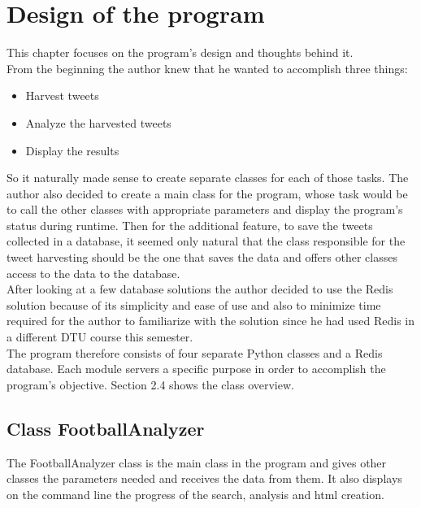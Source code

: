 \chapter[Design of the program]{Design of the program}
\label{chap:design_of_the_program}

This chapter focuses on the program's design and thoughts behind it.\\

From the beginning the author knew that he wanted to accomplish three things:
\begin{itemize}
	\item Harvest tweets
	\item Analyze the harvested tweets
	\item Display the results
\end{itemize}

So it naturally made sense to create separate classes for each of those tasks. The author also decided to
create a main class for the program, whose task would be to call the other classes with appropriate parameters
and display the program's status during runtime. Then for the additional feature, to save the tweets collected
in a database, it seemed only natural that the class responsible for the tweet harvesting should be the one that
saves the data and offers other classes access to the data to the database.\\

After looking at a few database solutions the author decided to use the Redis solution because of its simplicity
and ease of use and also to minimize time required for the author to familiarize with the solution since he had
used Redis in a different DTU course this semester.\\

The program therefore consists of four separate Python classes and a Redis database. Each module servers a specific 
purpose in order to accomplish the program's objective. Section 2.4 shows the class overview.

\section{Class FootballAnalyzer} \label{sec:FootballAnalyzerDesign}
The FootballAnalyzer class is the main class in the program and gives other classes the parameters needed 
and receives the data from them. It also displays on the command line the progress of the search, analysis
and html creation. 

